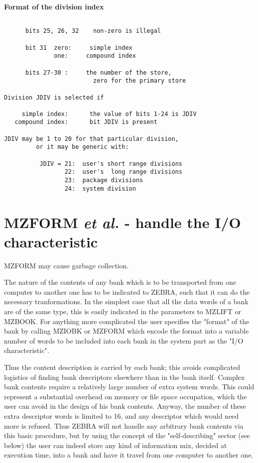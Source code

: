 {\large\bf Format of the division index}
\begin{verbatim}

      bits 25, 26, 32    non-zero is illegal

      bit 31  zero:     simple index
              one:     compound index

      bits 27-30 :     the number of the store,
                         zero for the primary store

Division JDIV is selected if

     simple index:      the value of bits 1-24 is JDIV
   compound index:      bit JDIV is present

JDIV may be 1 to 20 for that particular division,
         or it may be generic with:

          JDIV = 21:  user's short range divisions
                 22:  user's  long range divisions
                 23:  package divisions
                 24:  system division
\end{verbatim} 

\section{MZFORM {\it et al.} - handle the I/O characteristic}

MZFORM may cause garbage collection.

The nature of the contents of any bank which is to be transported
from one computer to another one has to be indicated to ZEBRA,
such that it can do the necessary tranformations.
In the simplest case that all the data words of a bank are
of the same type, this is easily indicated in the parameters
to MZLIFT or MZBOOK.
For anything more complicated the user specifies the "format"
of the bank by calling MZIOBK or MZFORM which encode the format
into a variable number of words to be included into each bank
in the system part as the "I/O characteristic".

Thus the content description is carried by each bank;
this avoids complicated logistics of finding bank descriptors
elsewhere than in the bank itself.
Complex bank contents require a relatively large number
of extra system words.
This could represent a substantial overhead on memory
or file space occupation,
which the user can avoid in the design of his bank contents.
Anyway, the number of these extra descriptor words is limited to 16,
and any descriptor which would need more is refused.
Thus ZEBRA will not handle any arbitrary bank contents
via this basic procedure,
but by using the concept of the "self-describing" sector (see below)
the user can indeed store any kind of information mix,
decided at execution time, into a bank and have it travel
from one computer to another one.

